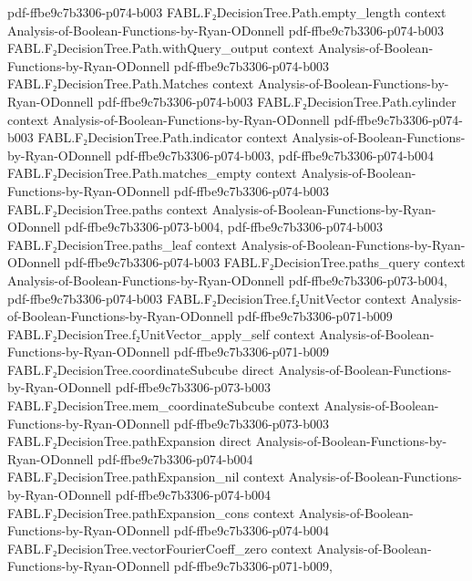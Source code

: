 \begin{theorem}
  {pdf-ffbe9c7b3306-p074-b003}
\proofstep
  {FABL.F₂DecisionTree.Path.empty_length}
  {context}
  {Analysis-of-Boolean-Functions-by-Ryan-ODonnell}
  {pdf-ffbe9c7b3306-p074-b003}
\proofstep
  {FABL.F₂DecisionTree.Path.withQuery_output}
  {context}
  {Analysis-of-Boolean-Functions-by-Ryan-ODonnell}
  {pdf-ffbe9c7b3306-p074-b003}
\proofstep
  {FABL.F₂DecisionTree.Path.Matches}
  {context}
  {Analysis-of-Boolean-Functions-by-Ryan-ODonnell}
  {pdf-ffbe9c7b3306-p074-b003}
\proofstep
  {FABL.F₂DecisionTree.Path.cylinder}
  {context}
  {Analysis-of-Boolean-Functions-by-Ryan-ODonnell}
  {pdf-ffbe9c7b3306-p074-b003}
\proofstep
  {FABL.F₂DecisionTree.Path.indicator}
  {context}
  {Analysis-of-Boolean-Functions-by-Ryan-ODonnell}
  {pdf-ffbe9c7b3306-p074-b003,
    pdf-ffbe9c7b3306-p074-b004}
\proofstep
  {FABL.F₂DecisionTree.Path.matches_empty}
  {context}
  {Analysis-of-Boolean-Functions-by-Ryan-ODonnell}
  {pdf-ffbe9c7b3306-p074-b003}
\proofstep
  {FABL.F₂DecisionTree.paths}
  {context}
  {Analysis-of-Boolean-Functions-by-Ryan-ODonnell}
  {pdf-ffbe9c7b3306-p073-b004,
    pdf-ffbe9c7b3306-p074-b003}
\proofstep
  {FABL.F₂DecisionTree.paths_leaf}
  {context}
  {Analysis-of-Boolean-Functions-by-Ryan-ODonnell}
  {pdf-ffbe9c7b3306-p074-b003}
\proofstep
  {FABL.F₂DecisionTree.paths_query}
  {context}
  {Analysis-of-Boolean-Functions-by-Ryan-ODonnell}
  {pdf-ffbe9c7b3306-p073-b004,
    pdf-ffbe9c7b3306-p074-b003}
\proofstep
  {FABL.F₂DecisionTree.f₂UnitVector}
  {context}
  {Analysis-of-Boolean-Functions-by-Ryan-ODonnell}
  {pdf-ffbe9c7b3306-p071-b009}
\proofstep
  {FABL.F₂DecisionTree.f₂UnitVector_apply_self}
  {context}
  {Analysis-of-Boolean-Functions-by-Ryan-ODonnell}
  {pdf-ffbe9c7b3306-p071-b009}
\proofstep
  {FABL.F₂DecisionTree.coordinateSubcube}
  {direct}
  {Analysis-of-Boolean-Functions-by-Ryan-ODonnell}
  {pdf-ffbe9c7b3306-p073-b003}
\proofstep
  {FABL.F₂DecisionTree.mem_coordinateSubcube}
  {context}
  {Analysis-of-Boolean-Functions-by-Ryan-ODonnell}
  {pdf-ffbe9c7b3306-p073-b003}
\proofstep
  {FABL.F₂DecisionTree.pathExpansion}
  {direct}
  {Analysis-of-Boolean-Functions-by-Ryan-ODonnell}
  {pdf-ffbe9c7b3306-p074-b004}
\proofstep
  {FABL.F₂DecisionTree.pathExpansion_nil}
  {context}
  {Analysis-of-Boolean-Functions-by-Ryan-ODonnell}
  {pdf-ffbe9c7b3306-p074-b004}
\proofstep
  {FABL.F₂DecisionTree.pathExpansion_cons}
  {context}
  {Analysis-of-Boolean-Functions-by-Ryan-ODonnell}
  {pdf-ffbe9c7b3306-p074-b004}
\proofstep
  {FABL.F₂DecisionTree.vectorFourierCoeff_zero}
  {context}
  {Analysis-of-Boolean-Functions-by-Ryan-ODonnell}
  {pdf-ffbe9c7b3306-p071-b009,
}
\end{theorem}
